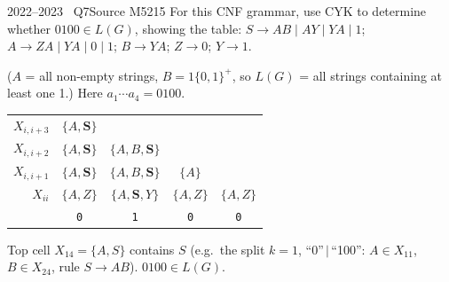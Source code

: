 \documentclass[11pt,a4paper]{article}
\begin{document}
\begin{question}{2022--2023 \textbullet\ Q7}{Source M52}{15}
For this CNF grammar, use CYK to determine whether $0100\in L(G)$, showing the table:
$S\to AB\mid AY\mid YA\mid1$; $A\to ZA\mid YA\mid0\mid1$; $B\to YA$; $Z\to0$; $Y\to1$.
\end{question}
\begin{solution}
($A$ = all non-empty strings, $B=1\{0,1\}^+$, so $L(G)$ = all strings containing at least one 1.) Here $a_1\cdots a_4=0100$.
\begin{center}\small\renewcommand{\arraystretch}{1.25}\begin{tabular}{r|cccc}\toprule
$X_{i,i+3}$ & $\{A,\mathbf{S}\}$ &  &  & \\
$X_{i,i+2}$ & $\{A,\mathbf{S}\}$ & $\{A,B,\mathbf{S}\}$ &  & \\
$X_{i,i+1}$ & $\{A,\mathbf{S}\}$ & $\{A,B,\mathbf{S}\}$ & $\{A\}$ & \\
$X_{ii}$ & $\{A,Z\}$ & $\{A,\mathbf{S},Y\}$ & $\{A,Z\}$ & $\{A,Z\}$\\
\midrule & \texttt{0} & \texttt{1} & \texttt{0} & \texttt{0}\\\bottomrule\end{tabular}\end{center}
Top cell $X_{14}=\{A,S\}$ contains $S$ (e.g.\ the split $k=1$, ``0''$\,|\,$``100'': $A\in X_{11}$, $B\in X_{24}$, rule $S\to AB$). \textbf{$0100\in L(G)$}.
\end{solution}
\end{document}
